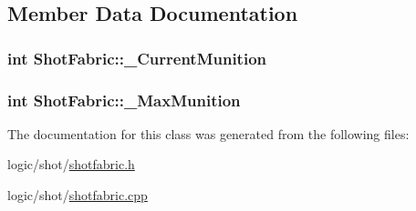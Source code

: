 \subsection{Member Data Documentation}
\hypertarget{class_shot_fabric_a5863cbc4e51a089b3e87a1afd77629ba}{
\subsubsection[{\-\_\-\-Current\-Munition}]{\setlength{\rightskip}{0pt plus 5cm}int Shot\-Fabric\-::\-\_\-\-Current\-Munition\hspace{0.3cm}{\ttfamily [protected]}}}\label{class_shot_fabric_a5863cbc4e51a089b3e87a1afd77629ba}
\hypertarget{class_shot_fabric_a89ed1c6e673c23fa50018dd06d867a66}{
\subsubsection[{\-\_\-\-Max\-Munition}]{\setlength{\rightskip}{0pt plus 5cm}int Shot\-Fabric\-::\-\_\-\-Max\-Munition\hspace{0.3cm}{\ttfamily [protected]}}}\label{class_shot_fabric_a89ed1c6e673c23fa50018dd06d867a66}


The documentation for this class was generated from the following files\-:\begin{DoxyCompactItemize}
\item 
logic/shot/\hyperlink{shotfabric_8h}{shotfabric.\-h}\item 
logic/shot/\hyperlink{shotfabric_8cpp}{shotfabric.\-cpp}\end{DoxyCompactItemize}
